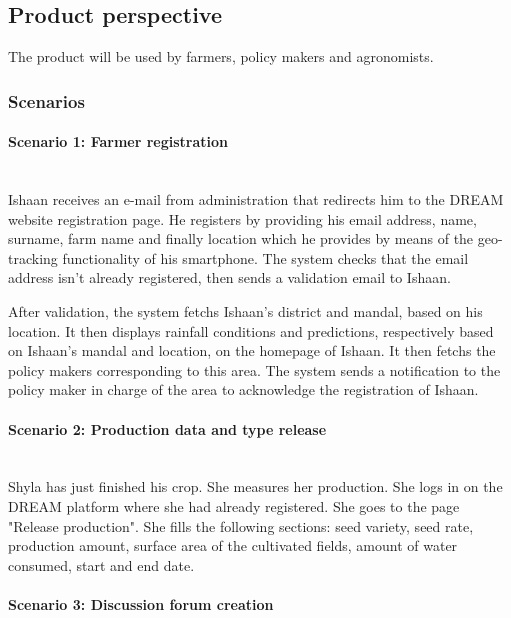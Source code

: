 \subsection{Product perspective}
The product will be used by farmers, policy makers and agronomists.
\subsubsection{Scenarios}

\paragraph{Scenario 1: Farmer registration}\mbox{} \\

Ishaan receives an e-mail from administration that redirects him to the DREAM website registration page. He registers by providing his email address, name, surname, farm name and finally location which he provides by means of the geo-tracking functionality of his smartphone. The system checks that the email address isn't already registered, then sends a validation email to Ishaan.

After validation, the system fetchs Ishaan's district and mandal, based on his location. It then displays rainfall conditions and predictions, respectively based on Ishaan's mandal and location, on the homepage of Ishaan. It then fetchs the policy makers corresponding to this area. The system sends a notification to the policy maker in charge of the area to acknowledge the registration of Ishaan.

\paragraph{Scenario 2: Production data and type release}\mbox{} \\

Shyla has just finished his crop. She measures her production. She logs in on the DREAM platform where she had already registered. She goes to the page "Release production". She fills the following sections: seed variety, seed rate, production amount, surface area of the cultivated fields, amount of water consumed, start and end date.

\paragraph{Scenario 3: Discussion forum creation}\mbox{} \\

